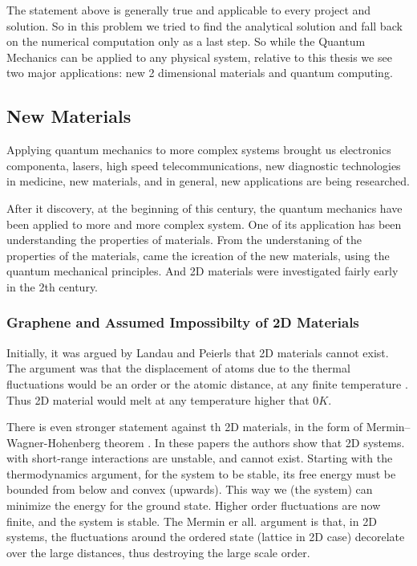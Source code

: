 The statement above is generally true and applicable to every project and solution. So in this problem we tried to find the analytical solution and fall back on the numerical computation only as a last step. So while the Quantum Mechanics can be applied to any physical system, relative to this thesis we see two major applications: new 2 dimensional materials and quantum computing.

\subsection*{New Materials}

Applying quantum mechanics to more complex systems brought us electronics componenta, lasers, high speed telecommunications, new diagnostic technologies in medicine, new materials, and in general, new applications are being researched.

After it discovery, at the beginning of this century, the quantum mechanics have been applied to more and more complex system. One of its application has been understanding the properties of materials.
From the understaning of the properties of the materials, came the icreation of the new materials, using the quantum mechanical principles. And 2D materials were investigated fairly early in the 2th century.

\subsubsection{Graphene and Assumed Impossibilty of 2D Materials}

Initially, it was argued by Landau and Peierls \cite{LandauG}\cite{Pierls} that 2D materials cannot exist. The argument was that the displacement of atoms due to the thermal fluctuations would be an order or the atomic distance, at any finite temperature \cite{LandauG, Pierls}. Thus 2D material would melt at any temperature higher that $ 0 K $. 

There is even stronger statement against th 2D materials, in the form of Mermin–Wagner-Hohenberg theorem \cite{Hohenberg}\cite{Mermin}. In these papers the authors show that 2D systems. with short-range interactions are unstable, and cannot exist. 
Starting with the thermodynamics argument, for the system to be stable, its free energy must be bounded from below and convex (upwards). This way we (the system) can minimize the energy for the ground state. Higher order fluctuations are now finite, and the system is stable.
The Mermin er all. argument is that, in 2D systems, the fluctuations around the ordered state (lattice in 2D case) decorelate over the large distances, thus destroying the large scale order. 

